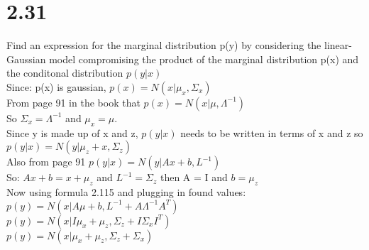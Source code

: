 \documentclass[11pt,leqno,fleqn]{article}
\begin{document}
\section{2.31}
Find an expression for the marginal distribution p(y) by considering the linear-Gaussian model compromising the product of the marginal distribution p(x) and the conditonal distribution $p(y|x)$\\
Since: p(x) is gaussian, $p(x) = N(x| \mu_x, \Sigma_x)$\\
From page 91 in the book that $p(x) = N(x|\mu,\Lambda^{-1})$\\
So $\Sigma_x = \Lambda^{-1}$ and $\mu_x = \mu$.\\
Since y is made up of x and z, $p(y|x)$ needs to be written in terms of x and z so $p(y|x) = N(y| \mu_z + x, \Sigma_z)$\\
Also from page 91  $p(y|x) = N(y|Ax+b, L^{-1})$\\
So: $Ax + b  = x + \mu_z $ and $L^{-1} = \Sigma_z$ then A = I and $b = \mu_z$\\
Now using formula 2.115 and plugging in found values:\\
$p(y) = N(x| A \mu + b, L^{-1} + A \Lambda^{-1} A^T)$\\
$p(y) = N(x| I \mu_x + \mu_z , \Sigma_z + I \Sigma_x I^T)$\\
$p(y) = N(x|  \mu_x + \mu_z , \Sigma_z +  \Sigma_x )$\\

\newpage
\end{document}
